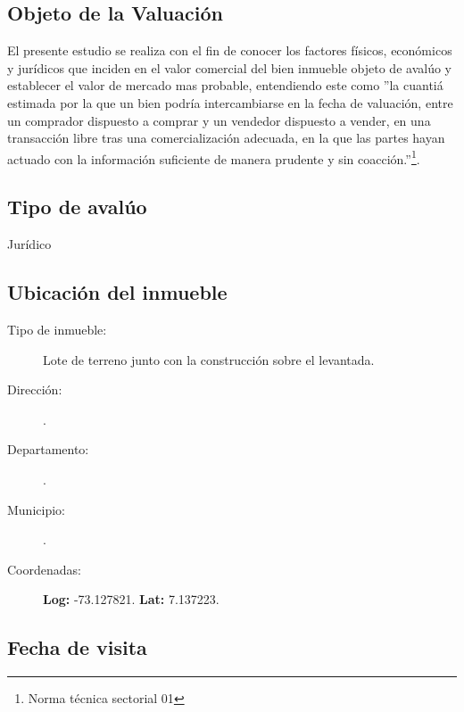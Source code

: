 \documentclass[12pt,a4paper,twoside]{article}
\begin{document}
\subsection{Objeto de la Valuación}

El presente estudio se realiza con el fin de conocer los factores físicos, económicos y jurídicos que inciden en el valor comercial del bien inmueble objeto de avalúo y establecer el valor de mercado mas probable, entendiendo este como ''la cuantiá estimada por la que un bien podría intercambiarse en la fecha de valuación, entre un comprador dispuesto a comprar y un vendedor dispuesto a vender, en una transacción libre tras una comercialización adecuada, en la que las partes hayan actuado con la información suficiente de manera prudente y sin coacción.''\footnote{Norma técnica sectorial 01}.

\subsection{Tipo de avalúo}

Jurídico

\subsection{Ubicación del inmueble}

\begin{description}
	
	\item[Tipo de inmueble: ] Lote de terreno junto con la construcción sobre el levantada.
	\item[Dirección: ] \Direccion.
	\item[Departamento: ] \Departamento.
	\item[Municipio: ] \Municipio.
	\item[Coordenadas: ] \textbf{Log:} -73.127821.
	 \textbf{Lat:} 7.137223. 
	
\end{description}
 
\subsection{Fecha de visita}
 
\end{document}
